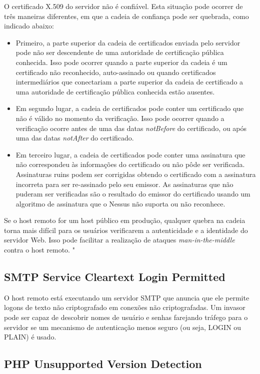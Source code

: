 \documentclass[
	12pt,				%
	openright,			%
	twoside,			%
	a4paper,			%
	english,			%
	french,				%
	spanish,			%
	brazil				%
	]{abntex2}
\begin{document}
 O certificado X.509 do servidor não é confiável. Esta situação pode ocorrer de três maneiras diferentes, em que a cadeia de confiança pode ser quebrada, como indicado abaixo:
\begin{itemize}
	\item Primeiro, a parte superior da cadeia de certificados enviada pelo servidor pode não ser descendente de uma autoridade de certificação pública conhecida. Isso pode ocorrer quando a parte superior da cadeia é um certificado não reconhecido, auto-assinado ou quando certificados intermediários que conectariam a parte superior da cadeia de certificado a uma autoridade de certificação pública conhecida estão ausentes.
	\item Em segundo lugar, a cadeia de certificados pode conter um certificado que não é válido no momento da verificação. Isso pode ocorrer quando a verificação ocorre antes de uma das datas \textit{notBefore} do certificado, ou após uma das datas \textit{notAfter} do certificado.
	\item Em terceiro lugar, a cadeia de certificados pode conter uma assinatura que não correspondeu às informações do certificado ou não pôde ser verificada. Assinaturas ruins podem ser corrigidas obtendo o certificado com a assinatura incorreta para ser re-assinado pelo seu emissor. As assinaturas que não puderam ser verificadas são o resultado do emissor do certificado usando um algoritmo de assinatura que o Nessus não suporta ou não reconhece.
\end{itemize}
Se o host remoto for um host público em produção, qualquer quebra na cadeia torna mais difícil para os usuários verificarem a autenticidade e a identidade do servidor Web. Isso pode facilitar a realização de ataques \textit{man-in-the-middle} contra o host remoto.  "

\subsection{SMTP Service Cleartext Login Permitted}

O host remoto está executando um servidor SMTP que anuncia que ele permite logons de texto não criptografado em conexões não criptografadas.  Um invasor pode ser capaz de descobrir nomes de usuário e senhas farejando tráfego para o servidor se um mecanismo de autenticação menos seguro (ou seja,  LOGIN ou PLAIN) é usado.

\subsection{PHP Unsupported Version Detection}
\end{document}
